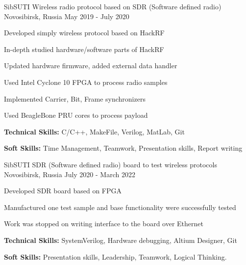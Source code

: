

\begin{cventries}

  \cventry
    {SibSUTI} %
    {Wireless radio protocol based on SDR (Software defined radio)} %
    {Novosibirsk, Russia} %
    {May 2019 - July 2020} %
    {
      \begin{cvitems} %
        \item {Developed simply wireless protocol based on HackRF}
        \item {In-depth studied hardware/software parts of HackRF}
        \item {Updated hardware firmware, added external data handler}
        \item {Used Intel Cyclone 10 FPGA to process radio samples}
        \item {Implemented Carrier, Bit, Frame synchronizers}
        \item {Used BeagleBone PRU cores to process payload}
        \item {\textbf{Technical Skills:} C/C++, MakeFile, Verilog, MatLab, Git}
        \item {\textbf{Soft Skills:} Time Management, Teamwork, Presentation skills, Report writing}
      \end{cvitems}
    }

  \cventry
    {SibSUTI} %
    {SDR (Software defined radio) board to test wireless protocols} %
    {Novosibirsk, Russia} %
    {July 2020 - March 2022} %
    {
      \begin{cvitems} %
        \item {Developed SDR board based on FPGA}
        \item {Manufactured one test sample and base functionality were successfully tested}
        \item {Work was stopped on writing interface to the board over Ethernet}
        \item {\textbf{Technical Skills:} SystemVerilog, Hardware debugging, Altium Designer, Git}
        \item {\textbf{Soft Skills:} Presentation skills, Leadership, Teamwork, Logical Thinking.}
      \end{cvitems}
    }

\end{cventries}
